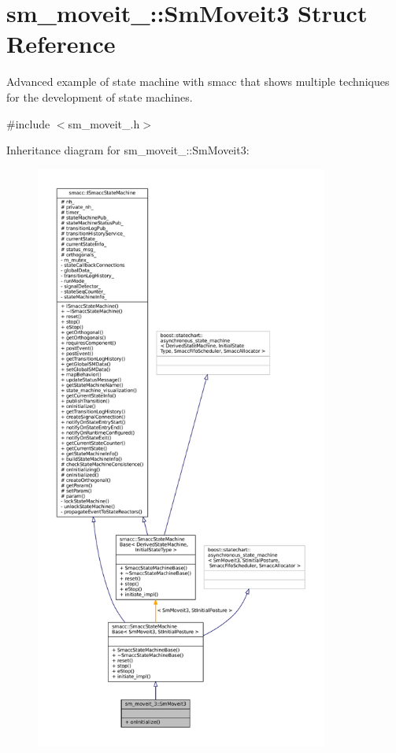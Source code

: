\hypertarget{structsm__moveit__3_1_1SmMoveit3}{}\section{sm\+\_\+moveit\+\_\+:\+:Sm\+Moveit3 Struct Reference}
\label{structsm__moveit__3_1_1SmMoveit3}


Advanced example of state machine with smacc that shows multiple techniques for the development of state machines.  




{\ttfamily \#include $<$sm\+\_\+moveit\+\_.\+h$>$}



Inheritance diagram for sm\+\_\+moveit\+\_\+:\+:Sm\+Moveit3\+:
\nopagebreak
\begin{figure}[H]
\begin{center}
\leavevmode
\includegraphics[height=550pt]{structsm__moveit__3_1_1SmMoveit3__inherit__graph}
\end{center}
\end{figure}


